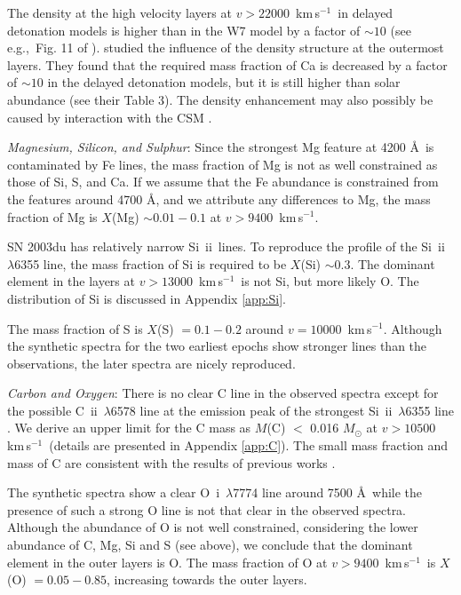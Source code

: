 \documentclass[usegraphicx,usenatbib]{mn2e}
\newcommand{\kms}{\mbox{\,km\,s$^{-1}$}}
\newcommand{\eg}{e.g.,\ }
\newcommand{\Msun}{M_{\odot}}
\newcommand{\OI}{O~{\sc i}}
\newcommand{\CII}{C~{\sc ii}}
\newcommand{\SiII}{Si~{\sc ii}}
\begin{document}
The density at the high velocity layers at $v>22000$ \kms\ in delayed
detonation models is higher than in the W7 model by a factor of $\sim 10$ (see
\eg Fig. 11 of \citealt{baron06}).  \citet{tanaka08Ia} studied the influence of
the density structure at the  outermost layers.  They found that the required
mass fraction of Ca is decreased by a factor of $\sim 10$ in the delayed
detonation models, but it is still higher than solar abundance (see their Table
3). The density enhancement may also possibly be caused by interaction with the
CSM \citep{gerardy04, mazzali0599ee}.


{\it Magnesium, Silicon, and Sulphur}:  Since the strongest Mg feature at 4200
\AA\ is contaminated by Fe lines, the mass fraction of Mg is not as well
constrained as those of Si, S, and Ca. If we assume that the Fe abundance is
constrained from the features around 4700 \AA, and we attribute any differences
to Mg, the mass fraction of Mg is $X$(Mg) $\sim 0.01 - 0.1$ at $v > 9400$ \kms.

SN 2003du has relatively narrow \SiII\ lines. To reproduce the profile of the
\SiII\ $\lambda$6355 line, the mass fraction of Si is required to be $X$(Si)
$\sim 0.3$. The dominant element in the layers at $v > 13000$ \kms\ is not Si, 
but more likely O. The distribution of Si is discussed in Appendix \ref{app:Si}.

The mass fraction of S is $X$(S) $= 0.1-0.2$ around $v = 10000$ \kms. Although
the synthetic spectra for the two earliest epochs show stronger lines than the
observations, the later spectra are nicely reproduced.

{\it Carbon and Oxygen}:  There is no clear C line in the observed spectra
except for the possible \CII\ $\lambda$6578 line at the emission peak of the
strongest \SiII\ $\lambda$6355 line \citep{stanishev07}. We derive an upper
limit for the C mass as $M$(C) $<$ 0.016 $\Msun$ at $v > 10500$ \kms\ 
(details are presented in Appendix \ref{app:C}). 
The small mass fraction and mass of C are consistent with the
results of previous works \citep{marion06, thomas07, tanaka08Ia,marion09NIR}.

The synthetic spectra show a clear \OI\ $\lambda$7774 line around 7500 \AA\
while the presence of such a strong O line is not that clear in the observed
spectra. Although the abundance of O is not well constrained, considering the
lower abundance of C, Mg, Si and S (see above), we conclude that the dominant
element in the outer layers is O. The mass fraction of O at $v>9400$ \kms\ is
$X$(O) $=0.05-0.85$, increasing towards the outer layers.
\end{document}

